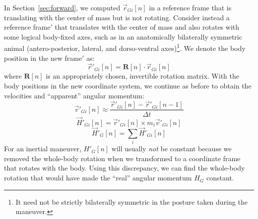 In Section~\ref{sec:forward}, we computed $\vec{r}_{Gi}[n]$ in a reference frame that is translating with the center of mass but is not rotating.  Consider instead a reference frame$'$ that translates with the center of mass and also rotates with some logical body-fixed axes, such as in an anatomically bilaterally symmetric animal (antero-posterior, lateral, and dorso-ventral axes)\footnote{It need not be strictly bilaterally symmetric in the posture taken during the maneuver.}.  We denote the body position in the new frame$'$ as:
\begin{equation}
\vec{r}'_{Gi}[n] = \mathbf{R}[n] \cdot \vec{r}_{Gi}[n]
\label{eq:rotation}
\end{equation}
where $\mathbf{R}[n]$ is an appropriately chosen, invertible rotation matrix. With the body positions in the new coordinate system, we continue as before to obtain the velocities and ``apparent'' angular momentum:
\begin{equation}
\vec{v}'_{Gi}[n] \approx \frac{\vec{r}'_{Gi}[n] - \vec{r}'_{Gi}[n-1]}{\Delta t}
\end{equation}
\begin{equation}
\vec{H}'_{Gi}[n] = \vec{r}'_{Gi}[n] \times m_i \vec{v}'_{Gi}[n]
\label{eq:fakeH}
\end{equation}
\begin{equation}
\vec{H}'_{G}[n] = \sum_i \vec{H}'_{Gi}[n]
\label{eq:apparent}
\end{equation}
For an inertial maneuver, $H'_G[n]$ will usually \emph{not} be constant because we removed the whole-body rotation when we transformed to a coordinate frame that rotates with the body. Using this discrepancy, we can find the whole-body rotation that would have made the ``real'' angular momentum $H_G$ constant. 

